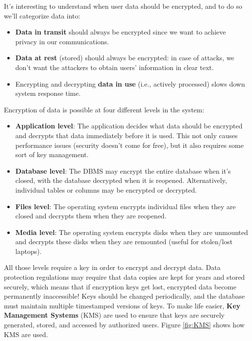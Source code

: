 \noindent It's interesting to understand when user data should be encrypted, and to do so we'll categorize data into:
\begin{itemize}
	\item \textbf{Data in transit} should always be encrypted since we want to achieve privacy in our communications.
	\item \textbf{Data at rest} (stored) should always be encrypted: in case of attacks, we don't want the attackers to obtain users' information in clear text.
	\item Encrypting and decrypting \textbf{data in use} (i.e., actively processed) slows down system response time.
\end{itemize}

\noindent Encryption of data is possible at four different levels in the system:
\begin{itemize}
	\item \textbf{Application level}: The application decides what data should be encrypted and decrypts that data immediately before it is used. This not only causes performance issues (security doesn't come for free), but it also requires some sort of key management. 
	\item \textbf{Database level}: The DBMS may encrypt the entire database when it's closed, with the database decrypted when it is reopened. Alternatively, individual tables or columns may be encrypted or decrypted.
	\item \textbf{Files level}: The operating system encrypts individual files when they are closed and decrypts them when they are reopened.
	\item \textbf{Media level}: The operating system encrypts disks when they are unmounted and decrypts these disks when they are remounted (useful for stolen/lost laptops).
\end{itemize}

All those levels require a key in order to encrypt and decrypt data. Data protection regulations may require that data copies are kept for years and stored securely, which means that if encryption keys get lost, encrypted data become permanently inaccessible! Keys should be changed periodically, and the database must maintain multiple timestamped versions of keys. To make life easier, \textbf{Key Management Systems} (KMS) are used to ensure that keys are securely generated, stored, and accessed by authorized users. Figure \ref{fig:KMS} shows how KMS are used.

